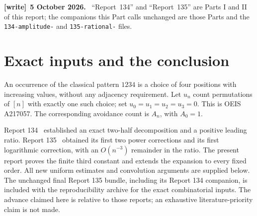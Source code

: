 \documentclass[11pt,letterpaper]{article}
\theoremstyle{remark}\newtheorem{remark}[theorem]{Remark}
\numberwithin{equation}{section}
\newcommand{\file}[1]{\nolinkurl{#1}}
\newenvironment{writenote}[1][]{\par\smallskip\begingroup\small
 \noindent\textbf{[write]}\if\relax\detokenize{#1}\relax\else~\textbf{#1.}\fi\ }%
 {\par\endgroup\smallskip}
\begin{document}
\begin{writenote}[5 October 2026]
``Report~134'' and ``Report~135'' \cite{R134,R135} are Parts I and II of this report; the companions this Part calls unchanged are those Parts and the \file{134-amplitude-} and \file{135-rational-} files.
\end{writenote}


\section{Exact inputs and the conclusion}\label{upo:all:sec:inputs}
An occurrence of the classical pattern $1234$ is a choice of four
positions with increasing values, without any adjacency requirement.
Let $u_n$ count permutations of $[n]$ with exactly one such choice; set
$u_0=u_1=u_2=u_3=0$. This is OEIS A217057. The corresponding avoidance
count is $A_n$, with $A_0=1$.

Report 134~\cite{R134} established an exact two-half decomposition and a
positive leading ratio. Report 135~\cite{R135} obtained its first two
power corrections and its first logarithmic correction, with an
$O(n^{-3})$ remainder in the ratio. The present report proves the finite
third constant and extends the expansion to every fixed order. All new
uniform estimates and convolution arguments are supplied below. The
unchanged final Report 135 bundle, including its Report 134 companion,
is included with the reproducibility archive for the exact combinatorial
inputs. The advance claimed here is relative to those reports; an
exhaustive literature-priority claim is not made.
\end{document}
